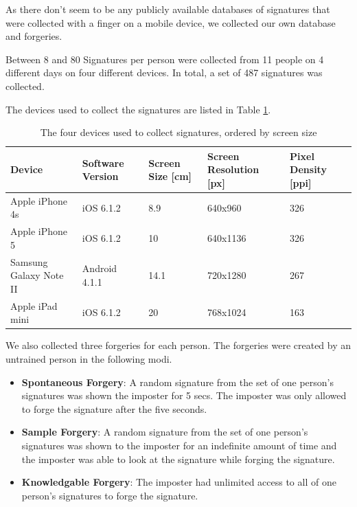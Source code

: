 \documentclass[a4paper, oneside]{csthesis}
\begin{document}
As there don't seem to be any publicly available databases of signatures that were collected with a finger on a mobile device, we collected our own database and forgeries.

Between 8 and 80 Signatures per person were collected from 11 people on 4 different days on four different devices. In total, a set of 487 signatures was collected.

The devices used to collect the signatures are listed in Table \ref{tbl:signatures-devices}.

\begin{table}[tb]
    \begin{center}
        \begin{tabular}{p{1.75cm}|p{2cm}p{2cm}p{2cm}p{2cm}}
        \hline

        \hline
        \textbf{Device} & \textbf{Software Version} & \textbf{Screen Size [cm]} & \textbf{Screen Resolution [px]} & \textbf{Pixel Density [ppi]} \\
        \hline
        Apple iPhone 4s & iOS 6.1.2 & 8.9 & 640x960 & 326 \\
        \hdashline[0.5pt/3pt]
        Apple iPhone 5 & iOS 6.1.2 & 10 & 640x1136 & 326 \\
        \hdashline[0.5pt/3pt]
        Samsung Galaxy Note II & Android 4.1.1 & 14.1 & 720x1280 & 267 \\
        \hdashline[0.5pt/3pt]
        Apple iPad mini & iOS 6.1.2 & 20 & 768x1024 & 163\\
        \hline
        \end{tabular}
    \end{center}
    \label{tbl:signatures-devices}
    \caption{The four devices used to collect signatures, ordered by screen size}
\end{table}

We also collected three forgeries for each person. The forgeries were created by an untrained person in the following modi.

\begin{itemize}
\item \textbf{Spontaneous Forgery}: A random signature from the set of one person's signatures was shown the imposter for 5 secs. The imposter was only allowed to forge the signature after the five seconds.
\item \textbf{Sample Forgery}: A random signature from the set of one person's signatures was shown to the imposter for an indefinite amount of time and the imposter was able to look at the signature while forging the signature.
\item \textbf{Knowledgable Forgery}: The imposter had unlimited access to all of one person's signatures to forge the signature.
\end{itemize}
\end{document}
